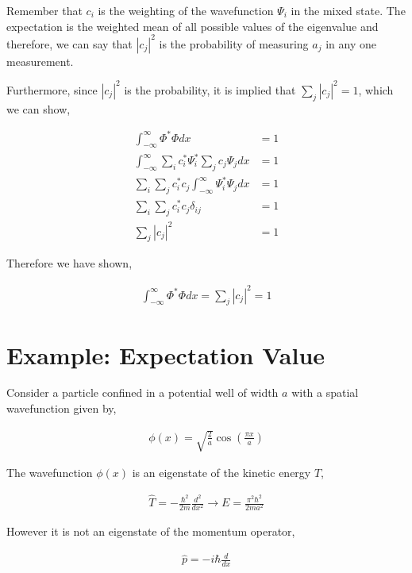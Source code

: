 \documentclass[11pt]{amsart}
\begin{document}
Remember that $c_i$ is the weighting of the wavefunction $\Psi_i$ in the mixed state. The expectation is the weighted mean of all possible values of the eigenvalue and therefore, we can say that ${|c_j|}^2$ is the probability of measuring $a_j$ in any one measurement.

Furthermore, since ${|c_j|}^2$ is the probability, it is implied that $\sum\limits_j {|c_j|}^2 = 1$, which we can show,

\begin{align*}
  \int_{-\infty}^{\infty} \Phi^*\Phi dx &= 1 \\
  \int_{-\infty}^{\infty} \sum\limits_i c_i^* \Psi_i^* \sum\limits_j c_j \Psi_j dx &= 1 \\
  \sum\limits_i \sum\limits_j c_i^* c_j \int_{-\infty}^{\infty} \Psi_i^* \Psi_j dx &= 1 \\
  \sum\limits_i \sum\limits_j c_i^* c_j \delta_{ij} &= 1 \\
  \sum\limits_j {|c_j|}^2 &= 1
\end{align*}

Therefore we have shown,

\begin{align*}
  \int_{-\infty}^{\infty} \Phi^*\Phi dx = \sum\limits_j {|c_j|}^2 = 1
\end{align*}

\section{Example: Expectation Value}

Consider a particle confined in a potential well of width $a$ with a spatial wavefunction given by,

\begin{align*}
  \phi(x) = \sqrt{\frac{2}{a}} \cos{\left(\frac{\pi x}{a}\right)}
\end{align*}

The wavefunction $\phi(x)$ is an eigenstate of the kinetic energy $T$,

\begin{align*}
  \hat{T} = -\frac{\hbar^2}{2m} \frac{d^2}{dx^2} \to E = \frac{\pi^2\hbar^2}{2ma^2}
\end{align*}

However it is not an eigenstate of the momentum operator,

\begin{align*}
  \hat{p} = -i\hbar\frac{d}{dx}
\end{align*}
\end{document}
